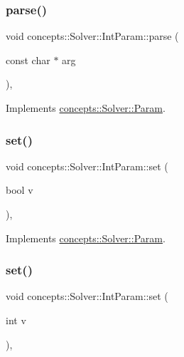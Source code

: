 \subsubsection{\texorpdfstring{parse()}{parse()}}
{\footnotesize\ttfamily void concepts\+::\+Solver\+::\+Int\+Param\+::parse (\begin{DoxyParamCaption}\item[{const char $\ast$}]{arg }\end{DoxyParamCaption})\hspace{0.3cm}{\ttfamily [inline]}, {\ttfamily [virtual]}}



Implements \hyperlink{classconcepts_1_1_solver_1_1_param_a0c2e4d895747668b01339db9226eceae}{concepts\+::\+Solver\+::\+Param}.

\mbox{\label{classconcepts_1_1_solver_1_1_int_param_aad1fef920b810b30289a2863d4ab6a52}} 
\subsubsection{\texorpdfstring{set()}{set()}\hspace{0.1cm}{\footnotesize\ttfamily [1/3]}}
{\footnotesize\ttfamily void concepts\+::\+Solver\+::\+Int\+Param\+::set (\begin{DoxyParamCaption}\item[{bool}]{v }\end{DoxyParamCaption})\hspace{0.3cm}{\ttfamily [inline]}, {\ttfamily [virtual]}}



Implements \hyperlink{classconcepts_1_1_solver_1_1_param_aa525a1a88dd771eaf5d66f35323fbb86}{concepts\+::\+Solver\+::\+Param}.

\mbox{\label{classconcepts_1_1_solver_1_1_int_param_aad283b6869373847cf9543e889f9fc91}} 
\subsubsection{\texorpdfstring{set()}{set()}\hspace{0.1cm}{\footnotesize\ttfamily [2/3]}}
{\footnotesize\ttfamily void concepts\+::\+Solver\+::\+Int\+Param\+::set (\begin{DoxyParamCaption}\item[{int}]{v }\end{DoxyParamCaption})\hspace{0.3cm}{\ttfamily [inline]}, {\ttfamily [virtual]}}



